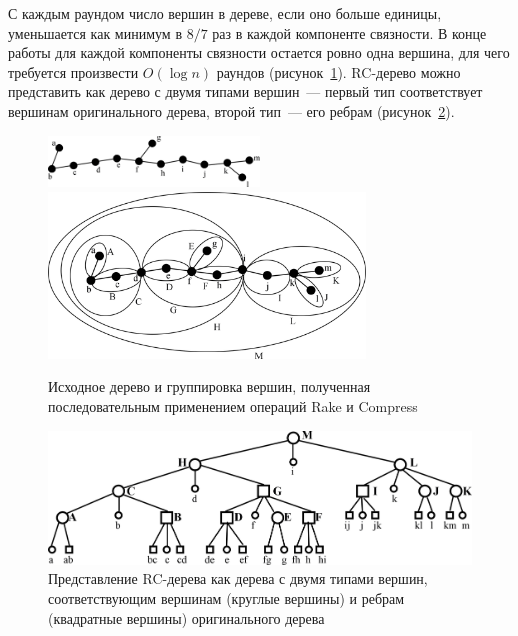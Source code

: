 \documentclass[specification,annotation]{itmo-student-thesis}
\begin{document}
С каждым раундом число вершин в дереве, если оно больше единицы, уменьшается как минимум в $8/7$ раз в каждой компоненте связности. В конце работы для каждой компоненты связности
остается ровно одна вершина, для чего требуется произвести $O(\log n)$ раундов (рисунок~\ref{fig:rctree-overall}). RC-дерево можно представить как дерево с двумя типами вершин~--- первый тип соответствует 
вершинам оригинального дерева, второй тип~--- его ребрам (рисунок~\ref{fig:rctree-two-types}).

\begin{figure}[!ht]
\centering
\includegraphics[width=0.5\textwidth]{pic/rc_tree_1_primitive_tree.png}\\
\includegraphics[width=0.75\textwidth]{pic/rc_tree_2_completed_clustering.png}
\caption{Исходное дерево и группировка вершин, полученная последовательным применением операций Rake и Compress}\label{fig:rctree-overall}
\end{figure}

\begin{figure}[!ht]
\centering
\includegraphics[width=\textwidth]{pic/rc_tree_4_two_types.png}
\caption{Представление RC-дерева как дерева с двумя типами вершин, соответствующим вершинам (круглые вершины) и ребрам (квадратные вершины) оригинального дерева}\label{fig:rctree-two-types}
\end{figure}
\end{document}
